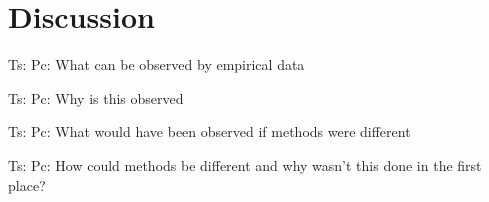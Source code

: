 \section{Discussion}

Ts: 
Pc: What can be observed by empirical data


Ts: 
Pc: Why is this observed

Ts: 
Pc: What would have been observed if methods were different

Ts: 
Pc: How could methods be different and why wasn't this done in the first place?